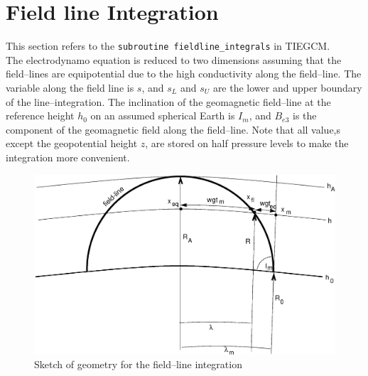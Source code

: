 %
\section{Field line Integration}\label{cap:fieldlineintg}
%
This section refers to the \texttt{subroutine fieldline\_integrals} in TIEGCM. \\
%

The electrodynamo equation is reduced to two dimensions
assuming that the field--lines
are equipotential due to the high conductivity along the field--line.
The variable along the field line is $s$, and ${s_L}$ and ${s_U}$ are
the lower and upper boundary
of the line--integration. The inclination of the geomagnetic field--line at the
reference height $h_0$ on an assumed spherical Earth is $I_m$, and $B_{e3}$ is 
the component of the geomagnetic field along the field--line. Note that all value,s except
the geopotential height $z$, are stored on half pressure levels to make the integration more
convenient. \\
%
\begin{figure}
  \centering
  \includegraphics[scale=0.3]{./tex_plot/fl_geometry.eps}
  \caption{Sketch of geometry for the field--line integration}
   \label{fig:fieldline_intg}
\end{figure}
%
